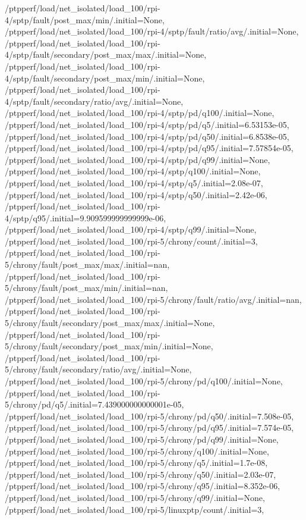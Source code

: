 {    /ptpperf/load/net_isolated/load_100/rpi-4/sptp/fault/post_max/min/.initial=None,
    /ptpperf/load/net_isolated/load_100/rpi-4/sptp/fault/ratio/avg/.initial=None,
    /ptpperf/load/net_isolated/load_100/rpi-4/sptp/fault/secondary/post_max/max/.initial=None,
    /ptpperf/load/net_isolated/load_100/rpi-4/sptp/fault/secondary/post_max/min/.initial=None,
    /ptpperf/load/net_isolated/load_100/rpi-4/sptp/fault/secondary/ratio/avg/.initial=None,
    /ptpperf/load/net_isolated/load_100/rpi-4/sptp/pd/q100/.initial=None,
    /ptpperf/load/net_isolated/load_100/rpi-4/sptp/pd/q5/.initial=6.53153e-05,
    /ptpperf/load/net_isolated/load_100/rpi-4/sptp/pd/q50/.initial=6.8538e-05,
    /ptpperf/load/net_isolated/load_100/rpi-4/sptp/pd/q95/.initial=7.57854e-05,
    /ptpperf/load/net_isolated/load_100/rpi-4/sptp/pd/q99/.initial=None,
    /ptpperf/load/net_isolated/load_100/rpi-4/sptp/q100/.initial=None,
    /ptpperf/load/net_isolated/load_100/rpi-4/sptp/q5/.initial=2.08e-07,
    /ptpperf/load/net_isolated/load_100/rpi-4/sptp/q50/.initial=2.42e-06,
    /ptpperf/load/net_isolated/load_100/rpi-4/sptp/q95/.initial=9.909599999999999e-06,
    /ptpperf/load/net_isolated/load_100/rpi-4/sptp/q99/.initial=None,
    /ptpperf/load/net_isolated/load_100/rpi-5/chrony/count/.initial=3,
    /ptpperf/load/net_isolated/load_100/rpi-5/chrony/fault/post_max/max/.initial=nan,
    /ptpperf/load/net_isolated/load_100/rpi-5/chrony/fault/post_max/min/.initial=nan,
    /ptpperf/load/net_isolated/load_100/rpi-5/chrony/fault/ratio/avg/.initial=nan,
    /ptpperf/load/net_isolated/load_100/rpi-5/chrony/fault/secondary/post_max/max/.initial=None,
    /ptpperf/load/net_isolated/load_100/rpi-5/chrony/fault/secondary/post_max/min/.initial=None,
    /ptpperf/load/net_isolated/load_100/rpi-5/chrony/fault/secondary/ratio/avg/.initial=None,
    /ptpperf/load/net_isolated/load_100/rpi-5/chrony/pd/q100/.initial=None,
    /ptpperf/load/net_isolated/load_100/rpi-5/chrony/pd/q5/.initial=7.439000000000001e-05,
    /ptpperf/load/net_isolated/load_100/rpi-5/chrony/pd/q50/.initial=7.508e-05,
    /ptpperf/load/net_isolated/load_100/rpi-5/chrony/pd/q95/.initial=7.574e-05,
    /ptpperf/load/net_isolated/load_100/rpi-5/chrony/pd/q99/.initial=None,
    /ptpperf/load/net_isolated/load_100/rpi-5/chrony/q100/.initial=None,
    /ptpperf/load/net_isolated/load_100/rpi-5/chrony/q5/.initial=1.7e-08,
    /ptpperf/load/net_isolated/load_100/rpi-5/chrony/q50/.initial=2.03e-07,
    /ptpperf/load/net_isolated/load_100/rpi-5/chrony/q95/.initial=8.352e-06,
    /ptpperf/load/net_isolated/load_100/rpi-5/chrony/q99/.initial=None,
    /ptpperf/load/net_isolated/load_100/rpi-5/linuxptp/count/.initial=3,
}
